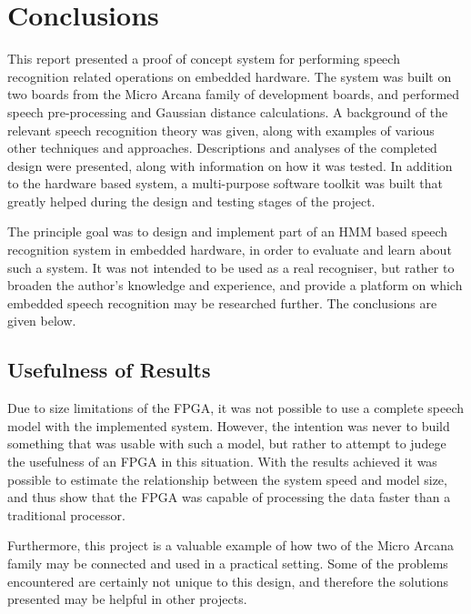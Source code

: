 \chapter{Conclusions} %
\label{cha:conclusions_and_future_work}


This report presented a proof of concept system for performing speech recognition related operations on embedded hardware.  The system was built on two boards from the Micro Arcana family of development boards, and performed speech pre-processing and Gaussian distance calculations.  A background of the relevant speech recognition theory was given, along with examples of various other techniques and approaches.  Descriptions and analyses of the completed design were presented, along with information on how it was tested.  In addition to the hardware based system, a multi-purpose software toolkit was built that greatly helped during the design and testing stages of the project.

The principle goal was to design and implement part of an HMM based speech recognition system in embedded hardware, in order to evaluate and learn about such a system.  It was not intended to be used as a real recogniser, but rather to broaden the author's knowledge and experience, and provide a platform on which embedded speech recognition may be researched further.  The conclusions are given below.


\section{Usefulness of Results} %
\label{sec:usefulness}
	Due to size limitations of the FPGA, it was not possible to use a complete speech model with the implemented system.  However, the intention was never to build something that was usable with such a model, but rather to attempt to judege the usefulness of an FPGA in this situation.  With the results achieved it was possible to estimate the relationship between the system speed and model size, and thus show that the FPGA was capable of processing the data faster than a traditional processor. %

	Furthermore, this project is a valuable example of how two of the Micro Arcana family may be connected and used in a practical setting.  Some of the problems encountered are certainly not unique to this design, and therefore the solutions presented may be helpful in other projects.

